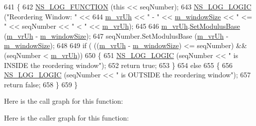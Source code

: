 \begin{DoxyCode}
641 \{
642   \hyperlink{log-macros-disabled_8h_a90b90d5bad1f39cb1b64923ea94c0761}{NS\_LOG\_FUNCTION} (\textcolor{keyword}{this} << seqNumber);
643   \hyperlink{group__logging_ga88acd260151caf2db9c0fc84997f45ce}{NS\_LOG\_LOGIC} (\textcolor{stringliteral}{"Reordering Window: "} <<
644                 \hyperlink{classns3_1_1LteRlcUmLowLat_aa5ff652a885ef59bdda2446f6abd3cd8}{m\_vrUh} << \textcolor{stringliteral}{" - "} << \hyperlink{classns3_1_1LteRlcUmLowLat_aecfdc0c06f03a1aa8958f06e077fd2fd}{m\_windowSize} << \textcolor{stringliteral}{" <= "} << seqNumber << \textcolor{stringliteral}{" < "} << 
      \hyperlink{classns3_1_1LteRlcUmLowLat_aa5ff652a885ef59bdda2446f6abd3cd8}{m\_vrUh});
645 
646   \hyperlink{classns3_1_1LteRlcUmLowLat_aa5ff652a885ef59bdda2446f6abd3cd8}{m\_vrUh}.\hyperlink{classns3_1_1SequenceNumber10_afd6d1e35503ecdab3a9b4b3e8c77e47c}{SetModulusBase} (\hyperlink{classns3_1_1LteRlcUmLowLat_aa5ff652a885ef59bdda2446f6abd3cd8}{m\_vrUh} - \hyperlink{classns3_1_1LteRlcUmLowLat_aecfdc0c06f03a1aa8958f06e077fd2fd}{m\_windowSize});
647   seqNumber.SetModulusBase (\hyperlink{classns3_1_1LteRlcUmLowLat_aa5ff652a885ef59bdda2446f6abd3cd8}{m\_vrUh} - \hyperlink{classns3_1_1LteRlcUmLowLat_aecfdc0c06f03a1aa8958f06e077fd2fd}{m\_windowSize});
648 
649   \textcolor{keywordflow}{if} ( ((\hyperlink{classns3_1_1LteRlcUmLowLat_aa5ff652a885ef59bdda2446f6abd3cd8}{m\_vrUh} - \hyperlink{classns3_1_1LteRlcUmLowLat_aecfdc0c06f03a1aa8958f06e077fd2fd}{m\_windowSize}) <= seqNumber) && (seqNumber < 
      \hyperlink{classns3_1_1LteRlcUmLowLat_aa5ff652a885ef59bdda2446f6abd3cd8}{m\_vrUh}))
650     \{
651       \hyperlink{group__logging_ga88acd260151caf2db9c0fc84997f45ce}{NS\_LOG\_LOGIC} (seqNumber << \textcolor{stringliteral}{" is INSIDE the reordering window"});
652       \textcolor{keywordflow}{return} \textcolor{keyword}{true};
653     \}
654   \textcolor{keywordflow}{else}
655     \{
656       \hyperlink{group__logging_ga88acd260151caf2db9c0fc84997f45ce}{NS\_LOG\_LOGIC} (seqNumber << \textcolor{stringliteral}{" is OUTSIDE the reordering window"});
657       \textcolor{keywordflow}{return} \textcolor{keyword}{false};
658     \}
659 \}
\end{DoxyCode}


Here is the call graph for this function\+:




Here is the caller graph for this function\+:


